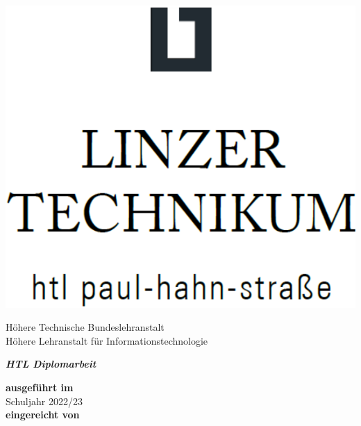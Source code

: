 

\begin{titlepage}
\begin{center}

\vspace*{-2.5cm}
\includegraphics[scale=0.125]{assets/litec-logo-high-res.png}

\vspace*{0.35cm}

{
\Large
\begin{spacing}{1.5}
Höhere Technische Bundeslehranstalt\\
Höhere Lehranstalt für Informationstechnologie%
\end{spacing}
}

\vspace{1.75cm}

{
\Huge
\color{litec-blue}
\textbf{\textsl{HTL Diplomarbeit}}
}

\vspace{1.2cm}

{
\Huge
\textsl{\ThesisTitle}
}

\vspace{0.9cm}

\begin{spacing}{3}
\textbf{ausgeführt im}\\
{
\Huge
\color{litec-blue}
{Schuljahr 2022/23}
}\\
\vspace{0.5cm}
\textbf{eingereicht von}
\end{spacing}


\end{center}
\end{titlepage}
